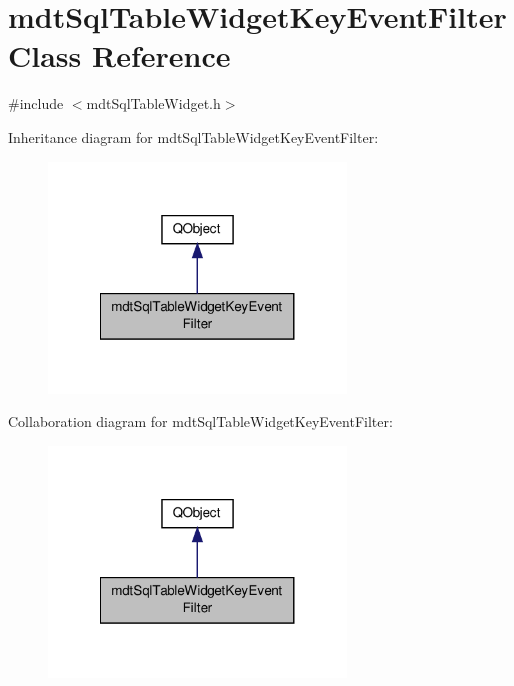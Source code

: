 \hypertarget{classmdt_sql_table_widget_key_event_filter}{\section{mdt\-Sql\-Table\-Widget\-Key\-Event\-Filter Class Reference}
\label{classmdt_sql_table_widget_key_event_filter}
}


{\ttfamily \#include $<$mdt\-Sql\-Table\-Widget.\-h$>$}



Inheritance diagram for mdt\-Sql\-Table\-Widget\-Key\-Event\-Filter\-:\nopagebreak
\begin{figure}[H]
\begin{center}
\leavevmode
\includegraphics[width=224pt]{classmdt_sql_table_widget_key_event_filter__inherit__graph}
\end{center}
\end{figure}


Collaboration diagram for mdt\-Sql\-Table\-Widget\-Key\-Event\-Filter\-:\nopagebreak
\begin{figure}[H]
\begin{center}
\leavevmode
\includegraphics[width=224pt]{classmdt_sql_table_widget_key_event_filter__coll__graph}
\end{center}
\end{figure}
